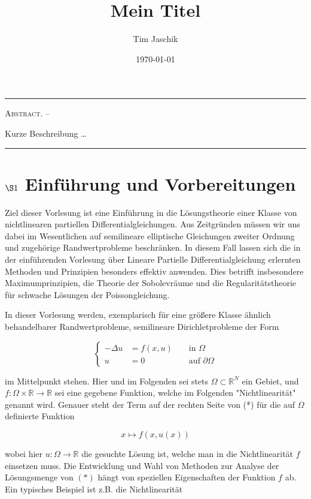 \documentclass[10pt, letterpaper]{article}
\title{Mein Titel}
\author{Tim Jaschik}
\date{\today}
\renewenvironment{abstract}
  {
    \begin{adjustwidth}{1.5cm}{1.5cm}
    \small
    \textsc{Abstract. –}%
  }
  {
    \end{adjustwidth}
  }
\begin{document}
\maketitle
\rule{\textwidth}{0.5pt}
\begin{abstract}
Kurze Beschreibung …
\end{abstract}
\rule{\textwidth}{0.5pt}
\vspace{0.5cm}

\tableofcontents

\pagebreak

\section*{$\S 1$ Einführung und Vorbereitungen}

Ziel dieser Vorlesung ist eine Einführung in die Lösungstheorie einer Klasse von nichtlinearen partiellen Differentialgleichungen. Aus Zeitgründen müssen wir uns dabei im Wesentlichen auf semilineare elliptische Gleichungen zweiter Ordnung und zugehörige Randwertprobleme beschränken. In diesem Fall lassen sich die in der einführenden Vorlesung über Lineare Partielle Differentialgleichung erlernten Methoden und Prinzipien besonders effektiv anwenden. Dies betrifft insbesondere Maximumprinzipien, die Theorie der Sobolevräume und die Regularitätstheorie für schwache Lösungen der Poissongleichung.

In dieser Vorlesung werden, exemplarisch für eine größere Klasse ähnlich behandelbarer Randwertprobleme, semilineare Dirichletprobleme der Form

$$
\left\{\begin{aligned}
-\Delta u & =f(x, u) & & \text { in } \Omega \\
u & =0 & & \text { auf } \partial \Omega
\end{aligned}\right.
$$

im Mittelpunkt stehen. Hier und im Folgenden sei stets $\Omega \subset \mathbb{R}^{N}$ ein Gebiet, und $f: \Omega \times \mathbb{R} \rightarrow \mathbb{R}$ sei eine gegebene Funktion, welche im Folgenden "Nichtlinearität" genannt wird. Genauer steht der Term auf der rechten Seite von (*) für die auf $\Omega$ definierte Funktion

$$
x \mapsto f(x, u(x))
$$

wobei hier $u: \Omega \rightarrow \mathbb{R}$ die gesuchte Lösung ist, welche man in die Nichtlinearität $f$ einsetzen muss. Die Entwicklung und Wahl von Methoden zur Analyse der Lösungsmenge von $(*)$ hängt von speziellen Eigenschaften der Funktion $f$ ab. Ein typisches Beispiel ist z.B. die Nichtlinearität
\end{document}
